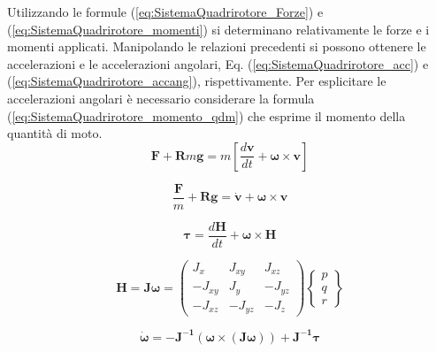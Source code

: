 Utilizzando le formule (\ref{eq:SistemaQuadrirotore_Forze}) e (\ref{eq:SistemaQuadrirotore_momenti}) si determinano relativamente le forze e i momenti applicati. Manipolando le relazioni precedenti si possono ottenere le accelerazioni e le accelerazioni angolari, Eq. (\ref{eq:SistemaQuadrirotore_acc}) e (\ref{eq:SistemaQuadrirotore_accang}), rispettivamente. Per esplicitare le accelerazioni angolari è necessario considerare la formula (\ref{eq:SistemaQuadrirotore_momento_qdm}) che esprime il momento della quantità di moto.
\begin{equation}\label{eq:SistemaQuadrirotore_Forze}
	\mathbf{F} + \mathbf{R} m \mathbf{g} = m \left[\frac{d \mathbf{v}}{d t} + \boldsymbol{\omega}\times \mathbf{v}\right]
\end{equation}

\begin{equation}\label{eq:SistemaQuadrirotore_acc}
	\frac{\mathbf{F}}{m} + \mathbf{R} \mathbf{g} = \mathbf{\dot{v}} + \boldsymbol{\omega} \times \mathbf{v}
\end{equation}

\begin{equation}\label{eq:SistemaQuadrirotore_momenti}
	\boldsymbol{\tau} = \frac{d \mathbf{H}}{d t } + \boldsymbol{\omega} \times \mathbf{H}
\end{equation}

\begin{equation}\label{eq:SistemaQuadrirotore_momento_qdm}
	\mathbf{H} = \mathbf{J} \boldsymbol{\omega} =
	\begin{pmatrix}
		J_x & J_{xy} & J_{xz} \\
		-J_{xy} & J_y & -J_{yz} \\
		-J_{xz} & -J_{yz} & -J_z 
	\end{pmatrix}
	\begin{Bmatrix}
		p\\
		q\\
		r
	\end{Bmatrix}
\end{equation}

\begin{equation}\label{eq:SistemaQuadrirotore_accang}
	\boldsymbol{\dot{\omega}} = - \mathbf{J^{-1}}\left(\boldsymbol{\omega}\times\left(\mathbf{J}\boldsymbol{\omega}\right)\right) + \mathbf{J^{-1}}\boldsymbol{\tau}
\end{equation}

